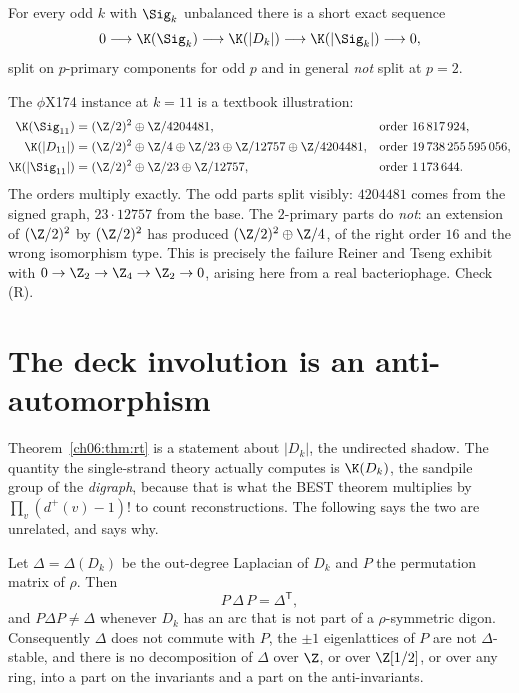 \begin{theorem}\label{ch06:thm:rt}
For every odd $k$ with $\Sig_k$ unbalanced there is a short exact sequence
\[
  0\longrightarrow \K(\Sig_k)\longrightarrow \K(|D_k|)\longrightarrow \K(|\Sig_k|)
  \longrightarrow 0 ,
\]
split on $p$-primary components for odd $p$ and in general \emph{not} split at $p=2$.
\end{theorem}

The $\phi$X174 instance at $k=11$ is a textbook illustration:
\[
\begin{aligned}
  \K(\Sig_{11})   &= (\Z/2)^2\oplus\Z/4204481, &&\text{order } 16\,817\,924,\\
  \K(|D_{11}|)    &= (\Z/2)^2\oplus\Z/4\oplus\Z/23\oplus\Z/12757\oplus\Z/4204481,
                  &&\text{order } 19\,738\,255\,595\,056,\\
  \K(|\Sig_{11}|) &= (\Z/2)^2\oplus\Z/23\oplus\Z/12757, &&\text{order } 1\,173\,644 .
\end{aligned}
\]
The orders multiply exactly. The odd parts split visibly: $4204481$ comes from the signed
graph, $23\cdot 12757$ from the base. The $2$-primary parts do \emph{not}: an extension of
$(\Z/2)^2$ by $(\Z/2)^2$ has produced $(\Z/2)^2\oplus\Z/4$, of the right order $16$ and the
wrong isomorphism type. This is precisely the failure Reiner and Tseng exhibit with
$0\to\Z_2\to\Z_4\to\Z_2\to 0$, arising here from a real bacteriophage. Check (R).

\section{The deck involution is an anti-automorphism}\label{ch06:sec:anti}

Theorem~\ref{ch06:thm:rt} is a statement about $|D_k|$, the undirected shadow. The quantity the
single-strand theory actually computes is $\K(D_k)$, the sandpile group of the
\emph{digraph}, because that is what the BEST theorem multiplies by
$\prod_v(d^+(v)-1)!$ to count reconstructions. The following says the two are unrelated, and
says why.

\begin{theorem}\label{ch06:thm:anti}
Let $\Delta=\Delta(D_k)$ be the out-degree Laplacian of $D_k$ and $P$ the permutation matrix
of $\rho$. Then
\[
  P\,\Delta\,P=\Delta^{\mathsf T},
\]
and $P\Delta P\ne\Delta$ whenever $D_k$ has an arc that is not part of a $\rho$-symmetric
digon. Consequently $\Delta$ does not commute with $P$, the $\pm1$ eigenlattices of $P$ are
not $\Delta$-stable, and there is no decomposition of $\Delta$ over $\Z$, or over
$\Z[1/2]$, or over any ring, into a part on the invariants and a part on the anti-invariants.
\end{theorem}

